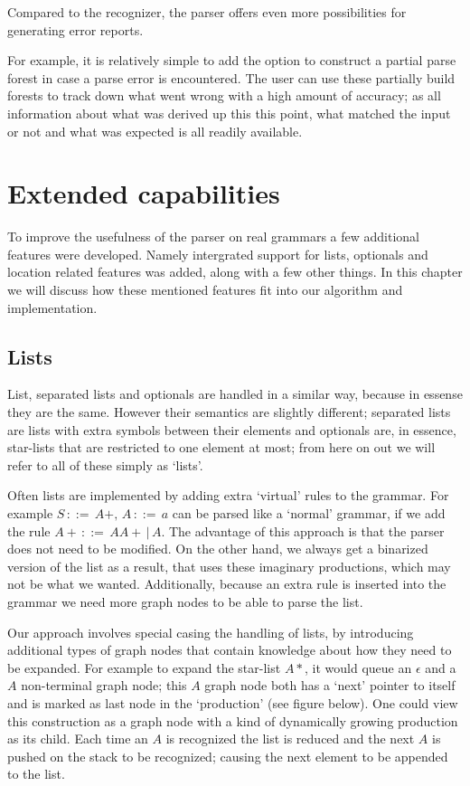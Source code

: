 \documentclass[a4paper,10pt]{article}
\begin{document}
Compared to the recognizer, the parser offers even more possibilities for generating error reports.

For example, it is relatively simple to add the option to construct a partial parse forest in case a parse error is encountered. The user can use these partially build forests to track down what went wrong with a high amount of accuracy; as all information about what was derived up this this point, what matched the input or not and what was expected is all readily available.

\section{Extended capabilities}

To improve the usefulness of the parser on real grammars a few additional features were developed. Namely intergrated support for lists, optionals and location related features was added, along with a few other things. In this chapter we will discuss how these mentioned features fit into our algorithm and implementation.

\subsection{Lists}

List, separated lists and optionals are handled in a similar way, because in essense they are the same. However their semantics are slightly different; separated lists are lists with extra symbols between their elements and optionals are, in essence, star-lists that are restricted to one element at most; from here on out we will refer to all of these simply as `lists'.

Often lists are implemented by adding extra `virtual' rules to the grammar. For example $S\,::=\,A+,\,A\,::=\,a$ can be parsed like a `normal' grammar, if we add the rule $A+\,::=\,AA+\,|\,A$. The advantage of this approach is that the parser does not need to be modified. On the other hand, we always get a binarized version of the list as a result, that uses these imaginary productions, which may not be what we wanted. Additionally, because an extra rule is inserted into the grammar we need more graph nodes to be able to parse the list.

Our approach involves special casing the handling of lists, by introducing additional types of graph nodes that contain knowledge about how they need to be expanded. For example to expand the star-list $A*$, it would queue an $\epsilon$ and a $A$ non-terminal graph node; this $A$ graph node both has a `next' pointer to itself and is marked as last node in the `production' (see figure below). One could view this construction as a graph node with a kind of dynamically growing production as its child. Each time an $A$ is recognized the list is reduced and the next $A$ is pushed on the stack to be recognized; causing the next element to be appended to the list.
\end{document}
